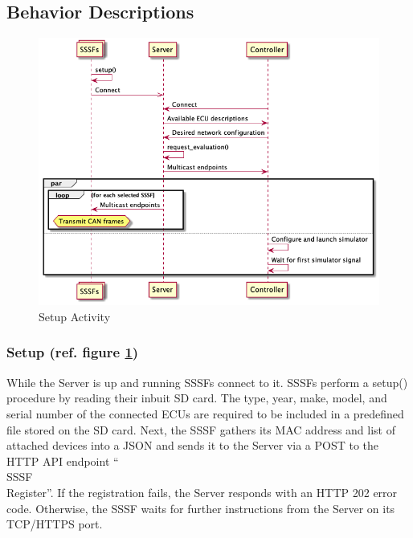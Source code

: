 \documentclass[letterpaper,twocolumn,12pt]{article}
\begin{document}
\subsection{Behavior Descriptions}

\begin{figure}[t!]
    \centering
    \includegraphics[width=\linewidth]{out/images/connection_setup/connection_setup.png}
    \caption{Setup Activity}
    \label{fig:setup_activity}
\end{figure}
\subsubsection{Setup (ref. figure \ref{fig:setup_activity})}
While the Server is up and running SSSFs connect to it. SSSFs perform a setup() procedure by reading their inbuit SD card. The type, year, make, model, and serial number of the connected ECUs are required to be included in a predefined file stored on the SD card. 
Next, the SSSF gathers its MAC address and list of attached devices into a JSON and sends it to the Server via a POST to the HTTP API endpoint “\\SSSF\\Register”. 
If the registration fails, the Server responds with an HTTP 202 error code. Otherwise, the SSSF waits for further instructions from the Server on its TCP/HTTPS port. 
\end{document}
